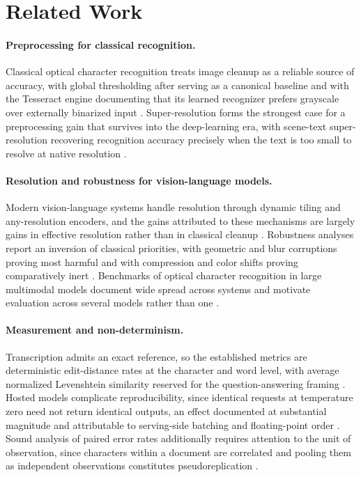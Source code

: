 \documentclass[11pt]{article}
\begin{document}
\section{Related Work}

\paragraph{Preprocessing for classical recognition.}
Classical optical character recognition treats image cleanup as a reliable source of accuracy, with
global thresholding after \citet{otsu1979threshold} serving as a canonical baseline and with the
Tesseract engine documenting that its learned recognizer prefers grayscale over externally
binarized input \citep{smith2007tesseract}. Super-resolution forms the strongest case for a
preprocessing gain that survives into the deep-learning era, with scene-text super-resolution
recovering recognition accuracy precisely when the text is too small to resolve at native
resolution \citep{wang2020textzoom}.

\paragraph{Resolution and robustness for vision-language models.}
Modern vision-language systems handle resolution through dynamic tiling and any-resolution encoders,
and the gains attributed to these mechanisms are largely gains in effective resolution rather than
in classical cleanup \citep{liu2024llavanext,wang2024qwen2vl}. Robustness analyses report an
inversion of classical priorities, with geometric and blur corruptions proving most harmful and with
compression and color shifts proving comparatively inert \citep{usama2025robustness}. Benchmarks of
optical character recognition in large multimodal models document wide spread across systems and
motivate evaluation across several models rather than one \citep{liu2023ocrbench}.

\paragraph{Measurement and non-determinism.}
Transcription admits an exact reference, so the established metrics are deterministic edit-distance
rates at the character and word level, with average normalized Levenshtein similarity reserved for
the question-answering framing \citep{biten2019stvqa}. Hosted models complicate reproducibility,
since identical requests at temperature zero need not return identical outputs, an effect documented
at substantial magnitude and attributable to serving-side batching and floating-point order
\citep{atil2024nondeterminism}. Sound analysis of paired error rates additionally requires
attention to the unit of observation, since characters within a document are correlated and pooling
them as independent observations constitutes pseudoreplication \citep{hurlbert1984pseudoreplication}.
\end{document}
